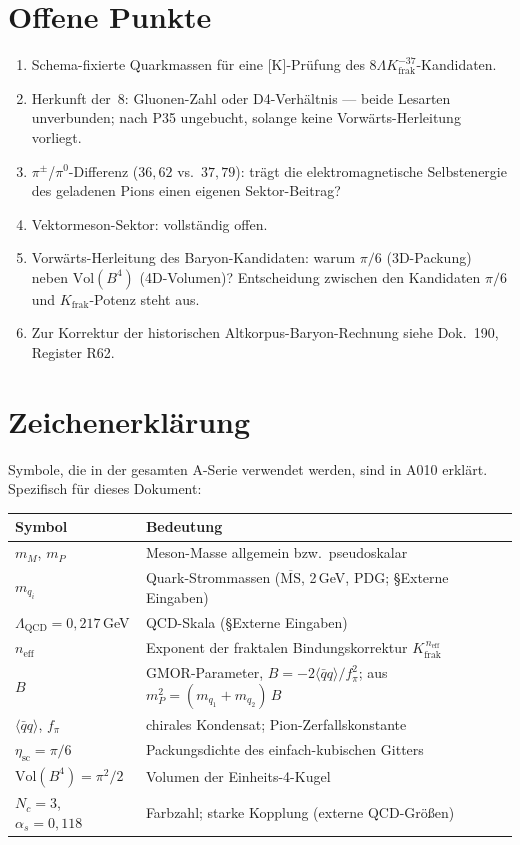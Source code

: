 \section{Offene Punkte}

\begin{enumerate}
\item Schema-fixierte Quarkmassen für eine [K]-Prüfung des
  $8\Lambda K_\text{frak}^{-37}$-Kandidaten.
\item Herkunft der~8: Gluonen-Zahl oder D4-Verhältnis --- beide Lesarten
  unverbunden; nach P35 ungebucht, solange keine Vorwärts-Herleitung
  vorliegt.
\item $\pi^\pm$/$\pi^0$-Differenz ($36{,}62$ vs.\ $37{,}79$): trägt die
  elektromagnetische Selbstenergie des geladenen Pions einen eigenen
  Sektor-Beitrag?
\item Vektormeson-Sektor: vollständig offen.
\item Vorwärts-Herleitung des Baryon-Kandidaten: warum $\pi/6$
  (3D-Packung) neben $\text{Vol}(B^4)$ (4D-Volumen)? Entscheidung
  zwischen den Kandidaten $\pi/6$ und $K_\text{frak}$-Potenz steht aus.
\item Zur Korrektur der historischen Altkorpus-Baryon-Rechnung siehe
  Dok.~190, Register R62.
\end{enumerate}

\section{Zeichenerklärung}

Symbole, die in der gesamten A-Serie verwendet werden, sind in A010 erklärt.
Spezifisch für dieses Dokument:

\begin{center}
\renewcommand{\arraystretch}{1.3}
{\small\begin{tabular}{lp{9cm}}
\toprule
Symbol & Bedeutung \\
\midrule
$m_M$, $m_P$ & Meson-Masse allgemein bzw.\ pseudoskalar \\
$m_{q_i}$ & Quark-Strommassen ($\overline{\text{MS}}$, 2\,GeV, PDG; \S{}Externe Eingaben) \\
$\Lambda_\text{QCD}=0{,}217$\,GeV & QCD-Skala (\S{}Externe Eingaben) \\
$n_\text{eff}$ & Exponent der fraktalen Bindungskorrektur $K_\text{frak}^{\,n_\text{eff}}$ \\
$B$ & GMOR-Parameter, $B=-2\langle\bar qq\rangle/f_\pi^2$; aus $m_P^2=(m_{q_1}+m_{q_2})\,B$ \\
$\langle\bar qq\rangle$, $f_\pi$ & chirales Kondensat; Pion-Zerfallskonstante \\
$\eta_\text{sc}=\pi/6$ & Packungsdichte des einfach-kubischen Gitters \\
$\text{Vol}(B^4)=\pi^2/2$ & Volumen der Einheits-4-Kugel \\
$N_c=3$, $\alpha_s=0{,}118$ & Farbzahl; starke Kopplung (externe QCD-Größen) \\
\bottomrule
\end{tabular}}
\renewcommand{\arraystretch}{1.0}
\end{center}

